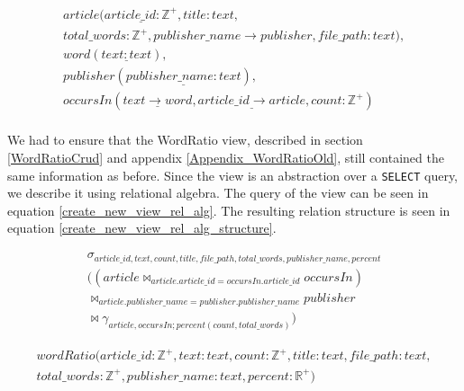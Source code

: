 \begin{equation}\label{eq:newDatabaseRelationalModel}
    \begin{split}
        article(\underline{article\_id: \mathbb{Z^+}}, title:text,\\ total\_words:\mathbb{Z^+}, publisher\_name \rightarrow publisher, file\_path:text), \\
        word(\underline{text:text}),\\
        publisher(\underline{publisher\_name:text}),\\
        occursIn(\underline{text \rightarrow word}, \underline{article\_id \rightarrow article}, count:\mathbb{Z^+})\\
    \end{split}
\end{equation}


We had to ensure that the WordRatio view, described in section \ref{WordRatioCrud} and appendix \ref{Appendix_WordRatioOld}, still contained the same information as before.
Since the view is an abstraction over a \texttt{SELECT} query, we describe it using relational algebra.
The query of the view can be seen in equation \ref{create_new_view_rel_alg}.
The resulting relation structure is seen in equation \ref{create_new_view_rel_alg_structure}.


\begin{equation}\label{create_new_view_rel_alg}
    \begin{split}
        \sigma_{article\_id, text, count,title, file\_path, total\_words, publisher\_name, percent} \\
        ((article \Join_{article.article\_id = occursIn.article\_id} occursIn) \\
        \Join_{article.publisher\_name = publisher.publisher\_name} publisher\\
        \Join \gamma_{article, occursIn;percent(count, total\_words)})
    \end{split}
\end{equation}

\begin{equation}\label{create_new_view_rel_alg_structure}
    \begin{split}
        wordRatio(article\_id:\mathbb{Z^+}, text:text, count:\mathbb{Z^+},title:text, file\_path:text,\\ total\_words:\mathbb{Z^+}, publisher\_name:text, percent:\mathbb{R^+})
    \end{split}
\end{equation}
